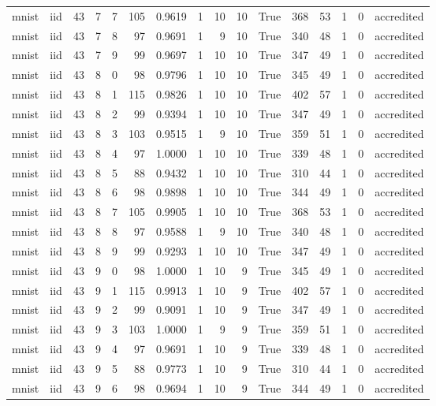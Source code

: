 \begin{tabular}{llrrrrrrrrrrrrrl}
mnist & iid & 43 & 7 & 7 & 105 & 0.9619 & 1 & 10 & 10 & True & 368 & 53 & 1 & 0 & accredited \\
mnist & iid & 43 & 7 & 8 & 97 & 0.9691 & 1 & 9 & 10 & True & 340 & 48 & 1 & 0 & accredited \\
mnist & iid & 43 & 7 & 9 & 99 & 0.9697 & 1 & 10 & 10 & True & 347 & 49 & 1 & 0 & accredited \\
mnist & iid & 43 & 8 & 0 & 98 & 0.9796 & 1 & 10 & 10 & True & 345 & 49 & 1 & 0 & accredited \\
mnist & iid & 43 & 8 & 1 & 115 & 0.9826 & 1 & 10 & 10 & True & 402 & 57 & 1 & 0 & accredited \\
mnist & iid & 43 & 8 & 2 & 99 & 0.9394 & 1 & 10 & 10 & True & 347 & 49 & 1 & 0 & accredited \\
mnist & iid & 43 & 8 & 3 & 103 & 0.9515 & 1 & 9 & 10 & True & 359 & 51 & 1 & 0 & accredited \\
mnist & iid & 43 & 8 & 4 & 97 & 1.0000 & 1 & 10 & 10 & True & 339 & 48 & 1 & 0 & accredited \\
mnist & iid & 43 & 8 & 5 & 88 & 0.9432 & 1 & 10 & 10 & True & 310 & 44 & 1 & 0 & accredited \\
mnist & iid & 43 & 8 & 6 & 98 & 0.9898 & 1 & 10 & 10 & True & 344 & 49 & 1 & 0 & accredited \\
mnist & iid & 43 & 8 & 7 & 105 & 0.9905 & 1 & 10 & 10 & True & 368 & 53 & 1 & 0 & accredited \\
mnist & iid & 43 & 8 & 8 & 97 & 0.9588 & 1 & 9 & 10 & True & 340 & 48 & 1 & 0 & accredited \\
mnist & iid & 43 & 8 & 9 & 99 & 0.9293 & 1 & 10 & 10 & True & 347 & 49 & 1 & 0 & accredited \\
mnist & iid & 43 & 9 & 0 & 98 & 1.0000 & 1 & 10 & 9 & True & 345 & 49 & 1 & 0 & accredited \\
mnist & iid & 43 & 9 & 1 & 115 & 0.9913 & 1 & 10 & 9 & True & 402 & 57 & 1 & 0 & accredited \\
mnist & iid & 43 & 9 & 2 & 99 & 0.9091 & 1 & 10 & 9 & True & 347 & 49 & 1 & 0 & accredited \\
mnist & iid & 43 & 9 & 3 & 103 & 1.0000 & 1 & 9 & 9 & True & 359 & 51 & 1 & 0 & accredited \\
mnist & iid & 43 & 9 & 4 & 97 & 0.9691 & 1 & 10 & 9 & True & 339 & 48 & 1 & 0 & accredited \\
mnist & iid & 43 & 9 & 5 & 88 & 0.9773 & 1 & 10 & 9 & True & 310 & 44 & 1 & 0 & accredited \\
mnist & iid & 43 & 9 & 6 & 98 & 0.9694 & 1 & 10 & 9 & True & 344 & 49 & 1 & 0 & accredited \\

\end{tabular}
